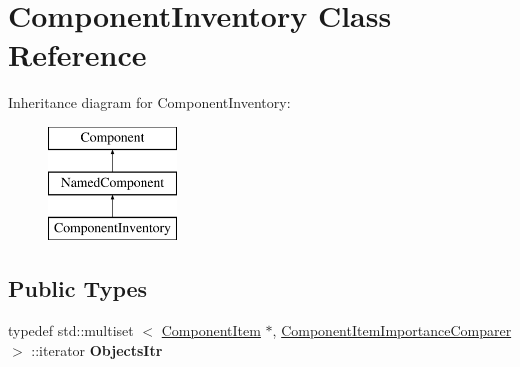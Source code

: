 \hypertarget{classComponentInventory}{
\section{\-Component\-Inventory \-Class \-Reference}
\label{d3/d71/classComponentInventory}
}
\-Inheritance diagram for \-Component\-Inventory\-:\begin{figure}[H]
\begin{center}
\leavevmode
\includegraphics[height=3.000000cm]{d3/d71/classComponentInventory}
\end{center}
\end{figure}
\subsection*{\-Public \-Types}
\begin{DoxyCompactItemize}
\item 
\hypertarget{classComponentInventory_a765be6f1e6a82570f6977874ffeb3a4a}{
typedef std\-::multiset\*
$<$ \hyperlink{classComponentItem}{\-Component\-Item} \*
$\ast$, \hyperlink{structComponentItemImportanceComparer}{\-Component\-Item\-Importance\-Comparer} $>$\*
\-::iterator {\bfseries \-Objects\-Itr}}
\label{d3/d71/classComponentInventory_a765be6f1e6a82570f6977874ffeb3a4a}

\end{DoxyCompactItemize}
